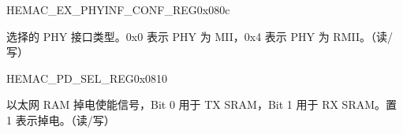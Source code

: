     \begin{register}{H}{EMAC\_EX\_PHYINF\_CONF\_REG}{0x080c}\label{regdesc:EMACEXPHYINFCONFREG}
    \regnewline%
    \begin{regdesc}\begin{reglist}
    \item [EMAC\_PHY\_INTF\_SEL] 选择的 PHY 接口类型。0x0 表示 PHY 为 MII，0x4 表示 PHY 为 RMII。（读/写）
    \end{reglist}\end{regdesc}
    \end{register}


    \begin{register}{H}{EMAC\_PD\_SEL\_REG}{0x0810}\label{regdesc:EMACPDSELREG}
    \regnewline%
    \begin{regdesc}\begin{reglist}
    \item [EMAC\_RAM\_PD\_EN]以太网 RAM 掉电使能信号，Bit 0 用于 TX SRAM，Bit 1 用于 RX SRAM。置 1 表示掉电。（读/写）
    \end{reglist}\end{regdesc}
    \end{register}



